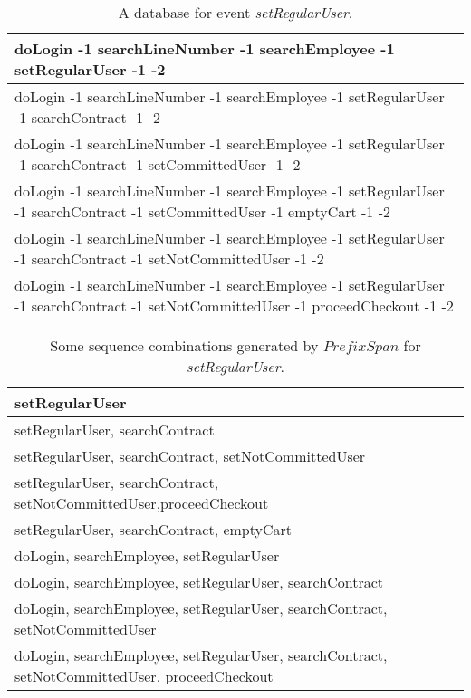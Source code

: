 \begin{table}[]
\begin{center}
\begin{tabular}{|p{15cm}|}

\hline

doLogin -1 searchLineNumber -1 searchEmployee -1 setRegularUser -1 -2 \\ \hline
doLogin -1 searchLineNumber -1 searchEmployee -1 setRegularUser -1 searchContract -1 -2\\ \hline
doLogin -1 searchLineNumber -1 searchEmployee -1 setRegularUser -1 searchContract -1 setCommittedUser -1 -2\\ \hline
doLogin -1 searchLineNumber -1 searchEmployee -1 setRegularUser -1 searchContract -1 setCommittedUser -1 emptyCart -1 -2\\ \hline
doLogin -1 searchLineNumber -1 searchEmployee -1 setRegularUser -1 searchContract -1 setNotCommittedUser -1 -2\\ \hline
doLogin -1 searchLineNumber -1 searchEmployee -1 setRegularUser -1 searchContract -1 setNotCommittedUser -1 proceedCheckout -1 -2\\

\hline
\end{tabular}
\end{center}
\caption{A database for event \textit{setRegularUser}.}
\label{specificDatabase}
\end{table}

\begin{table}[]
\begin{center}
\begin{tabular}{|p{15cm}|}

\hline

setRegularUser \\ \hline
setRegularUser, searchContract\\ \hline
setRegularUser, searchContract, setNotCommittedUser\\ \hline
setRegularUser, searchContract, setNotCommittedUser,proceedCheckout\\ \hline
setRegularUser, searchContract, emptyCart\\ \hline
doLogin, searchEmployee, setRegularUser\\ \hline
doLogin, searchEmployee, setRegularUser, searchContract\\ \hline
doLogin, searchEmployee, setRegularUser, searchContract, setNotCommittedUser\\ \hline
doLogin, searchEmployee, setRegularUser, searchContract, setNotCommittedUser, proceedCheckout\\

\hline
\end{tabular}
\end{center}
\caption{Some sequence combinations generated by $PrefixSpan$ for \textit{setRegularUser}.}
\label{combinations}
\end{table}

